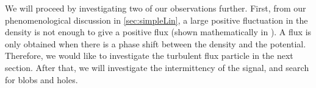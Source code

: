 We will proceed by investigating two of our observations further.
First, from our phenomenological discussion in \cref{sec:simpleLin}, a large positive fluctuation in the density is not enough to give a positive flux (shown mathematically in \cite{Garcia2001a}).
A flux is only obtained when there is a phase shift between the density and the potential.
Therefore, we would like to investigate the turbulent flux particle in the next section.
After that, we will investigate the intermittency of the signal, and search for blobs and holes.
